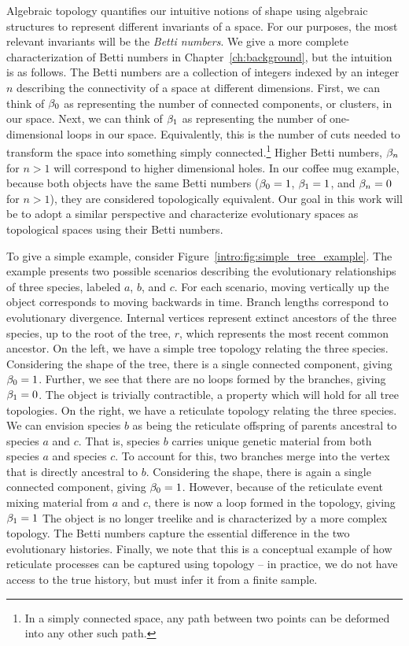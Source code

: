 Algebraic topology quantifies our intuitive notions of shape using algebraic structures to represent different invariants of a space.
For our purposes, the most relevant invariants will be the \emph{Betti numbers}.
We give a more complete characterization of Betti numbers in Chapter~\ref{ch:background}, but the intuition is as follows.
The Betti numbers are a collection of integers indexed by an integer $n$ describing the connectivity of a space at different dimensions.
First, we can think of $\beta_0$ as representing the number of connected components, or clusters, in our space.
Next, we can think of $\beta_1$ as representing the number of one-dimensional loops in our space.
Equivalently, this is the number of cuts needed to transform the space into something simply connected.\footnote{In a simply connected space, any path between two points can be deformed into any other such path.}
Higher Betti numbers, $\beta_n$ for $n>1$ will correspond to higher dimensional holes.
In our coffee mug example, because both objects have the same Betti numbers ($\beta_0=1$, $\beta_1=1$, and $\beta_n=0$ for $n>1$), they are considered topologically equivalent.
Our goal in this work will be to adopt a similar perspective and characterize evolutionary spaces as topological spaces using their Betti numbers.

To give a simple example, consider Figure~\ref{intro:fig:simple_tree_example}.
The example presents two possible scenarios describing the evolutionary relationships of three species, labeled $a$, $b$, and $c$.
For each scenario, moving vertically up the object corresponds to moving backwards in time.
Branch lengths correspond to evolutionary divergence.
Internal vertices represent extinct ancestors of the three species, up to the root of the tree, $r$, which represents the most recent common ancestor.
On the left, we have a simple tree topology relating the three species.
Considering the shape of the tree, there is a single connected component, giving $\beta_0=1$.
Further, we see that there are no loops formed by the branches, giving $\beta_1=0$.
The object is trivially contractible, a property which will hold for all tree topologies.
On the right, we have a reticulate topology relating the three species.
We can envision species $b$ as being the reticulate offspring of parents ancestral to species $a$ and $c$.
That is, species $b$ carries unique genetic material from both species $a$ and species $c$.
To account for this, two branches merge into the vertex that is directly ancestral to $b$.
Considering the shape, there is again a single connected component, giving $\beta_0=1$.
However, because of the reticulate event mixing material from $a$ and $c$, there is now a loop formed in the topology, giving $\beta_1=1$
The object is no longer treelike and is characterized by a more complex topology.
The Betti numbers capture the essential difference in the two evolutionary histories.
Finally, we note that this is a conceptual example of how reticulate processes can be captured using topology -- in practice, we do not have access to the true history, but must infer it from a finite sample.

